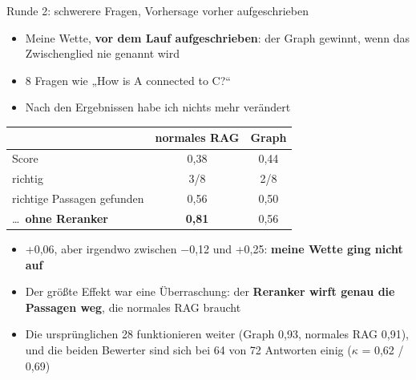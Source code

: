 \documentclass[aspectratio=169,11pt]{beamer}
\newcommand{\hl}[1]{\textcolor{midblue}{\textbf{#1}}}
\begin{document}
\begin{frame}{Runde 2: schwerere Fragen, Vorhersage vorher aufgeschrieben}
  \begin{itemize}\small
    \item Meine Wette, \hl{vor dem Lauf aufgeschrieben}: der Graph gewinnt, wenn das Zwischenglied nie genannt wird
    \item 8 Fragen wie „How is A connected to C?“
    \item Nach den Ergebnissen habe ich nichts mehr verändert
  \end{itemize}
  \centering\small
  \begin{tabular}{lcc}
    \toprule
    & normales RAG & Graph \\
    \midrule
    Score & 0,38 & 0,44 \\
    richtig & 3/8 & 2/8 \\
    richtige Passagen gefunden & 0,56 & 0,50 \\
    \ldots\ \hl{ohne Reranker} & \hl{0,81} & 0,56 \\
    \bottomrule
  \end{tabular}
  \vspace{6pt}
  \begin{itemize}\small
    \item +0,06, aber irgendwo zwischen $-$0,12 und +0,25: \hl{meine Wette ging nicht auf}
    \item Der größte Effekt war eine Überraschung: der \hl{Reranker wirft genau die Passagen weg},
          die normales RAG braucht
    \item Die ursprünglichen 28 funktionieren weiter (Graph 0,93, normales RAG 0,91), und die beiden
          Bewerter sind sich bei 64 von 72 Antworten einig ($\kappa$ = 0,62 / 0,69)
  \end{itemize}
\end{frame}
\end{document}
